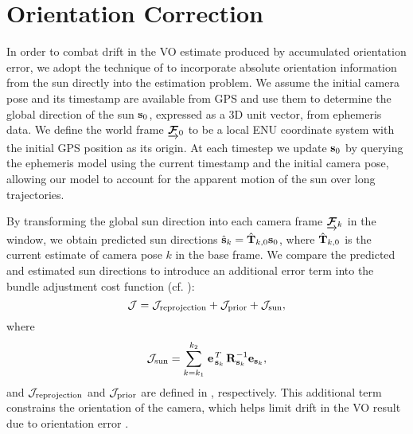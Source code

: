 \section{Orientation Correction}
In order to combat drift in the VO estimate produced by accumulated orientation error, we adopt the technique of \citet{Lambert2012-sn} to incorporate absolute orientation information from the sun directly into the estimation problem.
We assume the initial camera pose and its timestamp are available from GPS and use them to determine the global direction of the sun $\boldsymbol{\mathbf{s}}_0$, expressed as a 3D unit vector, from ephemeris data.
We define the world frame $\underrightarrow{ \boldsymbol{\mathbf{\mathcal{F}}} }_{0}$ to be a local ENU coordinate system with the initial GPS position as its origin.
At each timestep we update $\boldsymbol{\mathbf{s}}_0$ by querying the ephemeris model using the current timestamp and the initial camera pose, allowing our model to account for the apparent motion of the sun over long trajectories.

By transforming the global sun direction into each camera frame $\underrightarrow{ \boldsymbol{\mathbf{\mathcal{F}}} }_{k}$ in the window, we obtain predicted sun directions $\hat{\boldsymbol{\mathbf{s}}}_k = \hat{\boldsymbol{\mathbf{T}}}_{k,0} \boldsymbol{\mathbf{s}}_0$, where $\hat{\boldsymbol{\mathbf{T}}}_{k,0}$ is the current estimate of camera pose $k$ in the base frame. 
We compare the predicted and estimated sun directions to introduce an additional error term into the bundle adjustment cost function (cf. ):
\begin{equation} \label{eq:cost_function_with_sun}
    \mathcal{J} = \mathcal{J}_\text{reprojection} + \mathcal{J}_\text{prior} + \mathcal{J}_\text{sun},
\end{equation}
where 
\begin{equation} \label{eq:sun_cost}
	\mathcal{J}_\text{sun} = \sum_{k=k_1}^{k_2} \left.{\boldsymbol{\mathbf{e}}}\right.^T_{\boldsymbol{\mathbf{s}}_k} \boldsymbol{\mathbf{R}}^{-1}_{\boldsymbol{\mathbf{s}}_k} \boldsymbol{\mathbf{e}}_{\boldsymbol{\mathbf{s}}_k},
\end{equation}
and $\mathcal{J}_\text{reprojection}$ and $\mathcal{J}_\text{prior}$ are defined in , respectively.
This additional term constrains the orientation of the camera, which helps limit drift in the VO result due to orientation error \citep{Lambert2012-sn}.

